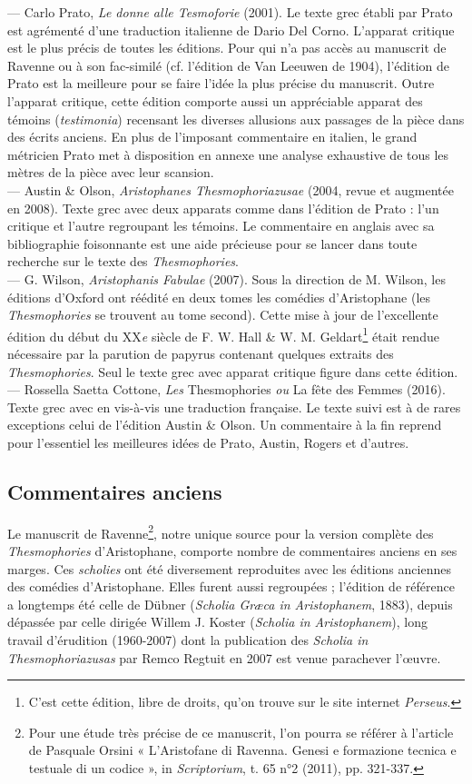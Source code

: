 \documentclass{book}%
\newcommand{\italique}[1]{\textit{#1}}%
\newcommand{\nieme}[1]{#1\italique{e}}%
\newcommand{\sousPartie}[1]{\subsection*{#1}}%
\newcommand{\note}[1]{\footnote{#1}}
\begin{document}
--- Carlo Prato, \italique{Le donne alle Tesmoforie} (2001). Le texte grec établi par Prato est agrémenté d’une traduction italienne de Dario Del Corno. L’apparat critique est le plus précis de toutes les éditions. Pour qui n’a pas accès au manuscrit de Ravenne ou à son fac-similé (cf. l'édition de Van Leeuwen de 1904), l’édition de Prato est la meilleure pour se faire l’idée la plus précise du manuscrit. Outre l’apparat critique, cette édition comporte aussi un appréciable apparat des témoins (\italique{testimonia}) recensant les diverses allusions aux passages de la pièce dans des écrits anciens. En plus de l’imposant commentaire en italien, le grand métricien Prato met à disposition en annexe une analyse exhaustive de tous les mètres de la pièce avec leur scansion. \\

--- Austin \& Olson, \italique{Aristophanes Thesmophoriazusae} (2004, revue et augmentée en 2008). Texte grec avec deux apparats comme dans l’édition de Prato : l’un critique et l’autre regroupant les témoins. Le commentaire en anglais avec sa bibliographie foisonnante est une aide précieuse pour se lancer dans toute recherche sur le texte des \italique{Thesmophories}. \\


--- G. Wilson, \italique{Aristophanis Fabulae} (2007). Sous la direction de M. Wilson, les éditions d’Oxford ont réédité en deux tomes les comédies d’Aristophane (les \italique{Thesmophories} se trouvent au tome second). Cette mise à jour de l’excellente édition du début du \nieme{XX} siècle de F. W. Hall \& W. M. Geldart\note{C’est cette édition, libre de droits, qu’on trouve sur le site internet \italique{Perseus}.} était rendue nécessaire par la parution de papyrus contenant quelques extraits des \italique{Thesmophories}. Seul le texte grec avec apparat critique figure dans cette édition. \\

--- Rossella Saetta Cottone, \italique{Les} Thesmophories \italique{ou} La fête des Femmes (2016). Texte grec avec en vis-à-vis une traduction française. Le texte suivi est à de rares exceptions celui de l’édition Austin \& Olson. Un commentaire à la fin reprend pour l’essentiel les meilleures idées de Prato, Austin, Rogers et d’autres. 


\sousPartie{Commentaires anciens}
Le manuscrit de Ravenne\note{Pour une étude très précise de ce manuscrit, l'on pourra se référer à l'article de Pasquale Orsini « L’Aristofane di Ravenna. Genesi e formazione tecnica e testuale di un codice »,  in \italique{Scriptorium}, t. 65 n°2 (2011), pp. 321-337.}, notre unique source pour la version complète des \italique{Thesmophories} d'Aristophane, comporte nombre de commentaires anciens en ses marges. Ces \italique{scholies} ont été diversement reproduites avec les éditions anciennes des comédies d'Aristophane. Elles furent aussi regroupées ; l'édition de référence a longtemps été celle de Dübner (\italique{Scholia Græca in Aristophanem}, 1883), depuis dépassée par celle dirigée Willem J. Koster (\italique{Scholia in Aristophanem}), long travail d'érudition (1960-2007) dont la publication des \italique{Scholia in Thesmophoriazusas} par Remco Regtuit en 2007 est venue parachever l'œuvre.
\end{document}
